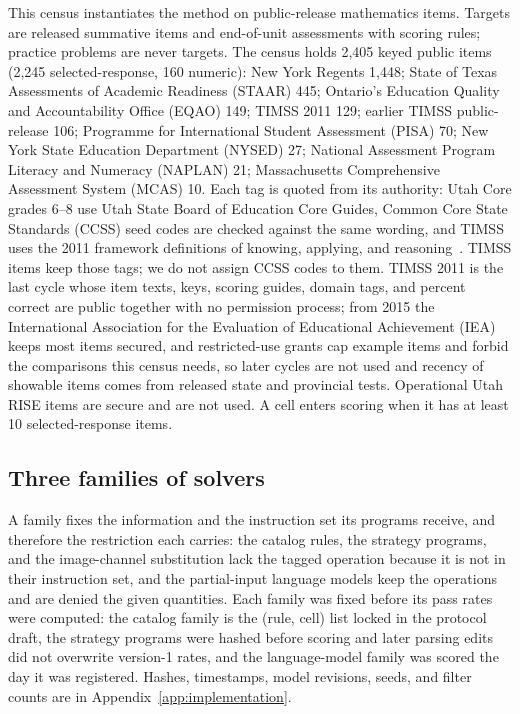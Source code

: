 This census instantiates the method on public-release mathematics items. Targets are released summative items and end-of-unit assessments with scoring rules; practice problems are never targets. The census holds 2{,}405 keyed public items (2{,}245 selected-response, 160 numeric): New York Regents 1{,}448; State of Texas Assessments of Academic Readiness (STAAR) 445; Ontario's Education Quality and Accountability Office (EQAO) 149; TIMSS 2011 129; earlier TIMSS public-release 106; Programme for International Student Assessment (PISA) 70; New York State Education Department (NYSED) 27; National Assessment Program Literacy and Numeracy (NAPLAN) 21; Massachusetts Comprehensive Assessment System (MCAS) 10. Each tag is quoted from its authority: Utah Core grades 6--8 use Utah State Board of Education Core Guides, Common Core State Standards (CCSS) seed codes are checked against the same wording, and TIMSS uses the 2011 framework definitions of knowing, applying, and reasoning~\cite{iea2009timss2011frameworks}. TIMSS items keep those tags; we do not assign CCSS codes to them. TIMSS 2011 is the last cycle whose item texts, keys, scoring guides, domain tags, and percent correct are public together with no permission process; from 2015 the International Association for the Evaluation of Educational Achievement (IEA) keeps most items secured, and restricted-use grants cap example items and forbid the comparisons this census needs, so later cycles are not used and recency of showable items comes from released state and provincial tests. Operational Utah RISE items are secure and are not used. A cell enters scoring when it has at least 10 selected-response items.

\subsection{Three families of solvers}
\label{sec:families}

A family fixes the information and the instruction set its programs receive, and therefore the restriction each carries: the catalog rules, the strategy programs, and the image-channel substitution lack the tagged operation because it is not in their instruction set, and the partial-input language models keep the operations and are denied the given quantities. Each family was fixed before its pass rates were computed: the catalog family is the (rule, cell) list locked in the protocol draft, the strategy programs were hashed before scoring and later parsing edits did not overwrite version-1 rates, and the language-model family was scored the day it was registered. Hashes, timestamps, model revisions, seeds, and filter counts are in Appendix~\ref{app:implementation}.

